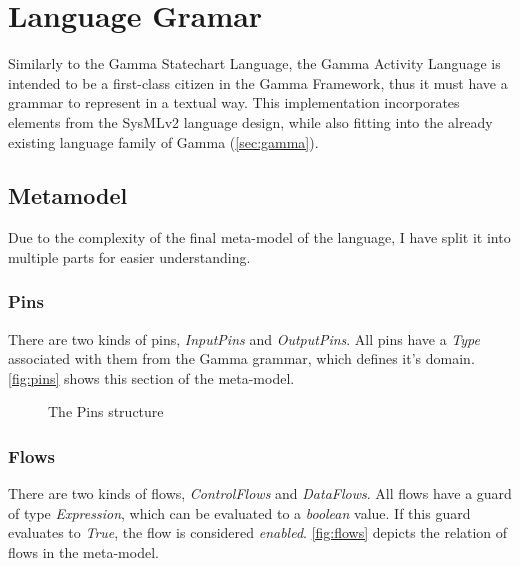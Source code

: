 \clearpage\section{Language Gramar}\label{sec:activity-grammar}

Similarly to the Gamma Statechart Language, the Gamma Activity Language is intended to be a first-class citizen in the Gamma Framework, thus it must have a grammar to represent in a textual way. This implementation incorporates elements from the SysMLv2 \cite{omg_sysml_v2} language design, while also fitting into the already existing language family of Gamma (\autoref{sec:gamma}).

\subsection{Metamodel}

Due to the complexity of the final meta-model of the language, I have split it into multiple parts for easier understanding.\

\subsubsection{Pins}\label{ssec:pins}

There are two kinds of pins, \emph{InputPins} and \emph{OutputPins}. All pins have a \emph{Type} associated with them from the Gamma grammar, which defines it's domain. \autoref{fig:pins} shows this section of the meta-model.

\begin{figure}[!ht]
	\centering
	
	\caption{The Pins structure}
	\label{fig:pins}
\end{figure}

\subsubsection{Flows}\label{ssec:flows}

There are two kinds of flows, \emph{ControlFlows} and \emph{DataFlows}. All flows have a guard of type \emph{Expression}, which can be evaluated to a \emph{boolean} value. If this guard evaluates to \emph{True}, the flow is considered \emph{enabled}. \autoref{fig:flows} depicts the relation of flows in the meta-model.

